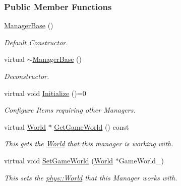 \subsubsection*{Public Member Functions}
\begin{DoxyCompactItemize}
\item 
\hypertarget{classphys_1_1ManagerBase_a80c0d01d0dc19511cd08fc6ac805a616}{
\hyperlink{classphys_1_1ManagerBase_a80c0d01d0dc19511cd08fc6ac805a616}{ManagerBase} ()}
\label{d2/de3/classphys_1_1ManagerBase_a80c0d01d0dc19511cd08fc6ac805a616}

\begin{DoxyCompactList}\small\item\em Default Constructor. \item\end{DoxyCompactList}\item 
virtual \hyperlink{classphys_1_1ManagerBase_a802dace8381459637297e9a372bfdf0c}{$\sim$ManagerBase} ()
\begin{DoxyCompactList}\small\item\em Deconstructor. \item\end{DoxyCompactList}\item 
virtual void \hyperlink{classphys_1_1ManagerBase_a57dd8e54e767427d5bdcc86dc66d73ed}{Initialize} ()=0
\begin{DoxyCompactList}\small\item\em Configure Items requiring other Managers. \item\end{DoxyCompactList}\item 
virtual \hyperlink{classphys_1_1World}{World} $\ast$ \hyperlink{classphys_1_1ManagerBase_addfd62fbc444ca4c2aba40768d1b284e}{GetGameWorld} () const 
\begin{DoxyCompactList}\small\item\em This gets the \hyperlink{classphys_1_1World}{World} that this manager is working with. \item\end{DoxyCompactList}\item 
virtual void \hyperlink{classphys_1_1ManagerBase_a97eb1e77c1f7a0925fc623836368a262}{SetGameWorld} (\hyperlink{classphys_1_1World}{World} $\ast$GameWorld\_\-)
\begin{DoxyCompactList}\small\item\em This sets the \hyperlink{classphys_1_1World}{phys::World} that this Manager works with. \item\end{DoxyCompactList}\item 

\end{DoxyCompactItemize}

